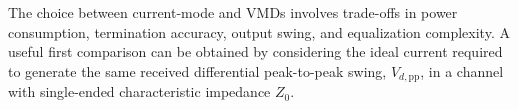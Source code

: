 The choice between current-mode and \acsp{VMD} involves trade-offs in power consumption, termination accuracy, output swing, and equalization complexity. A useful first comparison can be obtained by considering the ideal current required to generate the same received differential peak-to-peak swing, $V_{d,\mathrm{pp}}$, in a channel with single-ended characteristic impedance $Z_0$.

